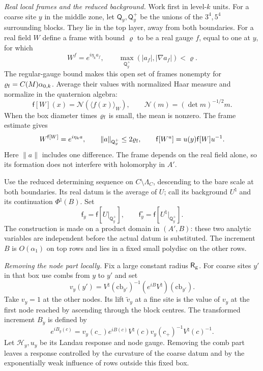 \documentclass[11pt,letterpaper,reqno]{amsart}
\theoremstyle{definition}
\theoremstyle{remark}
\begin{document}
\emph{Real local frames and the reduced background.}
Work first in level-\(k\) units. For a coarse site \(y\)
in the middle zone, let \(\mathsf Q_y,\mathsf Q_y^+\)
be the unions of the \(3^4,5^4\) surrounding blocks.
They lie in the top layer, away from both boundaries.
For a real field \(W\) define a frame with bound
\(\varrho\) to be a real gauge \(f\), equal to one
at \(y\), for which
\[
 W^f=e^{i\eta_ka_f},\qquad
 \max_{\mathsf Q_y^+}(|a_f|,|\nabla a_f|)<\varrho .
\]
The regular-gauge bound makes this open set of frames
nonempty for
\(\varrho_{\rm f}=C(M)\alpha_{0,k}\).
Average their values with normalized Haar measure
and normalize in the quaternion algebra:
\[
 \mathsf f[W](x)=\mathcal N(\langle f(x)\rangle_W),
 \qquad \mathcal N(m)=(\det m)^{-1/2}m .
\]
When the box diameter times \(\varrho_{\rm f}\) is
small, the mean is nonzero. The frame estimate gives
\[
 W^{\mathsf f[W]}=e^{i\eta_k a},\qquad
 \|a\|_{\mathsf Q_y^+}\le2\varrho_{\rm f},\qquad
 \mathsf f[W^u]=u(y)\mathsf f[W]u^{-1}.
\]
Here \(\|a\|\) includes one difference. The frame
depends on the real field alone, so its formation
does not interfere with holomorphy in \(A'\).

Use the reduced determining sequence on
\(C\setminus\Lambda_C\), descending to the bare
scale at both boundaries. Its real datum is the
average of \(U\); call its background \(U^\natural\)
and its continuation \(\Phi^\natural(B)\).
Set
\[
 \mathsf f_y=\mathsf f[U|_{\mathsf Q_y^+}],\qquad
 \mathsf f_y^\circ=\mathsf f[U^\natural|_{\mathsf Q_y^+}].
\]
The construction is made on a product domain in
\((A',B)\): these two analytic variables are
independent before the actual datum is substituted.
The increment \(B\) is \(O(\alpha_1)\) on top rows
and lies in a fixed small polydisc on the other rows.

\emph{Removing the node part locally.}
Fix a large constant radius \(\mathsf R_{\rm g}\).
For coarse sites \(y'\) in that box use combs
from \(y\) to \(y'\) and set
\[
 v_y(y')=
       V^\natural(\mathrm{cb}_{y'})^{-1}
                 (e^{iB}V^\natural)(\mathrm{cb}_{y'}).
\]
Take \(v_y=1\) at the other nodes. Its lift
\(\widetilde v_y\) at a fine site is the value of
\(v_y\) at the first node reached by ascending through
the block centres. The transformed
increment \(B_y\) is defined by
\[
 e^{iB_y(c)}=
 v_y(c_-)e^{iB(c)}V^\natural(c)
                  v_y(c_+)^{-1}V^\natural(c)^{-1}.
\]
Let \(\mathcal H_y,u_y\) be its Landau response and
node gauge. Removing the comb part leaves a response
controlled by the curvature of the coarse datum
and by the exponentially weak influence of rows
outside this fixed box.
\end{document}
